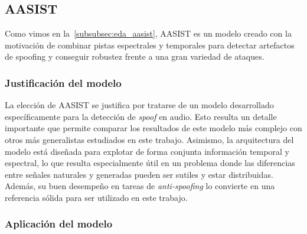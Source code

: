 \subsection{AASIST}
\label{subsubsec:met_aasist}
Como vimos en la~\autoref{subsubsec:eda_aasist}, AASIST es un modelo creado con la motivación de combinar pistas espectrales y temporales para detectar artefactos de spoofing y conseguir robustez frente a una gran variedad de ataques.

\subsubsection*{Justificación del modelo}

La elección de AASIST se justifica por tratarse de un modelo desarrollado específicamente para la detección de \textit{spoof} en audio. Esto resulta un detalle importante que permite comparar los resultados de este modelo más complejo con otros más generalistas estudiados en este trabajo.
Asimismo, la arquitectura del modelo está diseñada para explotar de forma conjunta información temporal y espectral, lo que resulta especialmente útil en un problema donde las diferencias entre señales naturales y generadas pueden ser sutiles y estar distribuidas. Además, su buen desempeño en tareas de \textit{anti-spoofing} lo convierte en una referencia sólida para ser utilizado en este trabajo.

\subsubsection*{Aplicación del modelo}

